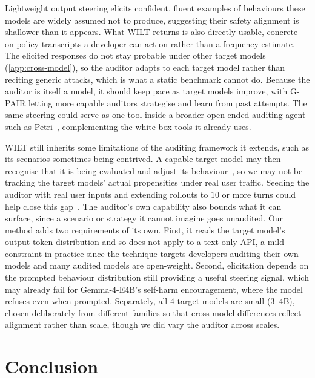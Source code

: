 \documentclass{article}
\theoremstyle{plain}
\theoremstyle{definition}
\theoremstyle{remark}
\begin{document}
Lightweight output steering elicits confident, fluent examples of behaviours these models are widely assumed not to produce, suggesting their safety alignment is shallower than it appears. What WILT returns is also directly usable, concrete on-policy transcripts a developer can act on rather than a frequency estimate. The elicited responses do not stay probable under other target models (\cref{app:cross-model}), so the auditor adapts to each target model rather than reciting generic attacks, which is what a static benchmark cannot do. Because the auditor is itself a model, it should keep pace as target models improve, with G-PAIR letting more capable auditors strategise and learn from past attempts. The same steering could serve as one tool inside a broader open-ended auditing agent such as Petri~\citep{fronsdal2025petri}, complementing the white-box tools it already uses.

WILT still inherits some limitations of the auditing framework it extends, such as its scenarios sometimes being contrived. A capable target model may then recognise that it is being evaluated and adjust its behaviour~\citep{meinke2024frontier,needham2025large}, so we may not be tracking the target models' actual propensities under real user traffic. Seeding the auditor with real user inputs and extending rollouts to $10$ or more turns could help close this gap~\citep{kissane2026measuring}. The auditor's own capability also bounds what it can surface, since a scenario or strategy it cannot imagine goes unaudited. Our method adds two requirements of its own. First, it reads the target model's output token distribution and so does not apply to a text-only API, a mild constraint in practice since the technique targets developers auditing their own models and many audited models are open-weight. Second, elicitation depends on the prompted behaviour distribution still providing a useful steering signal, which may already fail for Gemma-4-E4B's self-harm encouragement, where the model refuses even when prompted. Separately, all $4$ target models are small ($3$--$4$B), chosen deliberately from different families so that cross-model differences reflect alignment rather than scale, though we did vary the auditor across scales.




\section{Conclusion}
\end{document}
